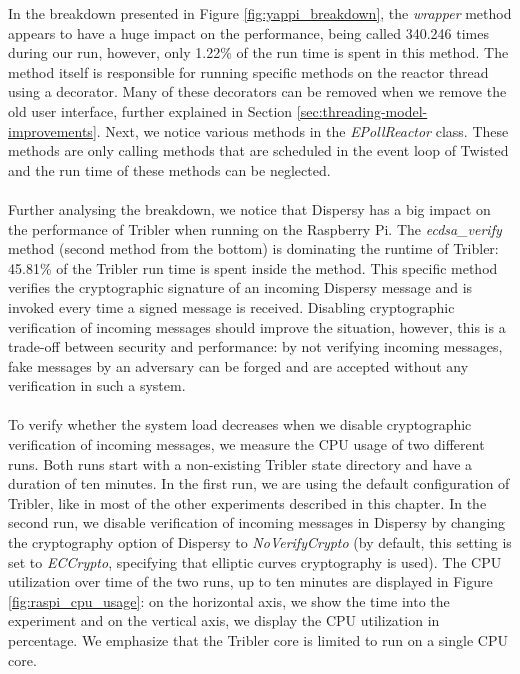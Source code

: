 In the breakdown presented in Figure \ref{fig:yappi_breakdown}, the \emph{wrapper} method appears to have a huge impact on the performance, being called 340.246 times during our run, however, only 1.22\% of the run time is spent in this method. The method itself is responsible for running specific methods on the reactor thread using a decorator. Many of these decorators can be removed when we remove the old user interface, further explained in Section \ref{sec:threading-model-improvements}. Next, we notice various methods in the \emph{EPollReactor} class. These methods are only calling methods that are scheduled in the event loop of Twisted and the run time of these methods can be neglected.\\\\
Further analysing the breakdown, we notice that Dispersy has a big impact on the performance of Tribler when running on the Raspberry Pi. The \emph{ecdsa\_verify} method (second method from the bottom) is dominating the runtime of Tribler: 45.81\% of the Tribler run time is spent inside the method. This specific method verifies the cryptographic signature of an incoming Dispersy message and is invoked every time a signed message is received. Disabling cryptographic verification of incoming messages should improve the situation, however, this is a trade-off between security and performance: by not verifying incoming messages, fake messages by an adversary can be forged and are accepted without any verification in such a system.\\\\
To verify whether the system load decreases when we disable cryptographic verification of incoming messages, we measure the CPU usage of two different runs. Both runs start with a non-existing Tribler state directory and have a duration of ten minutes. In the first run, we are using the default configuration of Tribler, like in most of the other experiments described in this chapter. In the second run, we disable verification of incoming messages in Dispersy by changing the cryptography option of Dispersy to \emph{NoVerifyCrypto} (by default, this setting is set to \emph{ECCrypto}, specifying that elliptic curves cryptography is used). The CPU utilization over time of the two runs, up to ten minutes are displayed in Figure \ref{fig:raspi_cpu_usage}: on the horizontal axis, we show the time into the experiment and on the vertical axis, we display the CPU utilization in percentage. We emphasize that the Tribler core is limited to run on a single CPU core.\\

